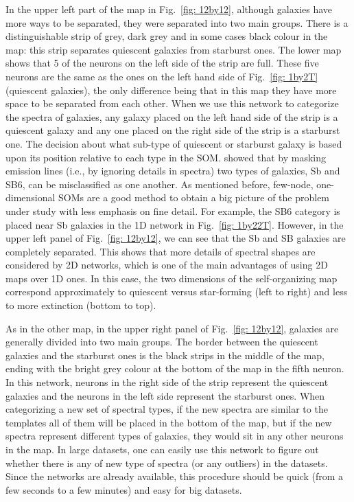     
        In the upper left part of the map in Fig.~\ref{fig: 12by12}, although galaxies have more ways to be separated, they were separated into two main groups.
        There is a distinguishable strip of grey, dark grey and in some cases black colour in the map:
        this strip separates quiescent galaxies from starburst ones.
        The lower map shows that 5 of the neurons on the left side of the strip are full. 
        These five neurons are the same as the ones on the left hand side of Fig.~\ref{fig: 1by2T} (quiescent galaxies),
        the only difference being that in this map they have more space to be separated from each other.
        When we use this network to categorize the spectra of galaxies, any galaxy placed on the left hand side of the strip is a quiescent galaxy and any one placed on the right side of the strip is a starburst one.
        The decision about what sub-type of quiescent or starburst galaxy is based upon its position relative to each type in the SOM.
         showed that by masking emission lines (i.e., by ignoring details in spectra) two types of galaxies, Sb and SB6, can be misclassified as one another.
        As mentioned before, few-node, one-dimensional SOMs are a good method to obtain a big picture of the problem under study with less emphasis on fine detail. 
        For example, the SB6 category is placed near Sb galaxies in the 1D network in Fig.~\ref{fig: 1by22T}.
        However, in the upper left panel of Fig.~\ref{fig: 12by12}, we can see that the Sb and SB galaxies are completely separated. 
        This shows that more details of spectral shapes are considered by 2D networks, which is one of the main advantages of  using 2D maps over 1D ones.
       In this case, the two dimensions of the self-organizing map correspond approximately to quiescent versus star-forming (left to right) and less to more extinction (bottom to top). 
    
        As in the other map, in the upper right panel of Fig.~\ref{fig: 12by12}, galaxies are generally divided into two main groups.
        The border between the quiescent galaxies and the starburst ones is the black strips in the middle of the map, ending with the bright grey colour at the bottom of the map in the fifth neuron.
        In this network, neurons in the right side of the strip represent the quiescent galaxies and the neurons in the left side represent the starburst ones. 
        When categorizing a new set of spectral types, if the new spectra are similar to the  templates all of them will be placed in the bottom of the map, but if the new spectra represent different types of galaxies, they would sit in any other neurons in the map.
        In large datasets, one can easily use this network to figure out whether there is any of new type of spectra (or any outliers) in the datasets. 
        Since the networks are already available, this procedure should be quick (from a few seconds to a few minutes) and easy for big datasets.
          
